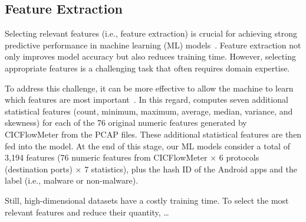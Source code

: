 \subsection{Feature Extraction}


Selecting relevant features (i.e., feature extraction) is crucial for achieving strong predictive performance in
machine learning (ML) models~\cite{DBLP:conf/ichmi/Xie22,DBLP:journals/mta/AmiriebrahimabadiM24}. Feature extraction not only
improves model accuracy but also reduces training time. However, selecting appropriate features is a challenging task that often requires domain expertise. 

To address this challenge, it can be more effective to allow the machine to learn which features are most important~\cite{DBLP:journals/spe/FallahB22}.
In this regard, \droidxpflow computes seven additional statistical features (count, minimum, maximum, average, median, variance, and skewness)
for each of the 76 original numeric features generated by CICFlowMeter from the PCAP files. These additional statistical features are then fed into the model. 
At the end of this stage, our ML models consider a total of 3,194 features (76 numeric features from CICFlowMeter $\times$ 6 protocols (destination ports) $\times$ 7 statistics),  
plus the hash ID of the Android apps and the label (i.e., malware or non-malware).


Still, high-dimensional datasets have a costly training time. To select the most relevant features and reduce their quantity, \droidxpflow \ldots
